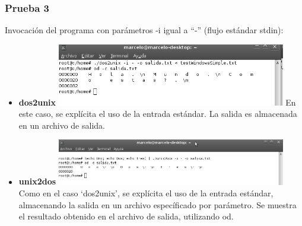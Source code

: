 \documentclass[a4paper,10pt]{article}
\begin{document}
    \subsubsection{Prueba 3}
    Invocaci\'on del programa con par\'ametros -i igual a ``-'' (flujo est\'andar stdin):
      \begin{itemize}
      \item \textbf{dos2unix}
      \newline 
      \includegraphics[width=10cm, viewport=0 0 670 180]{../Informe/Imagenes/prueba3-invocacion-dos2unix.png}
      \newline	
      En este caso, se expl\'icita el uso de la entrada est\'andar. La salida es almacenada en un archivo
      de salida. 
      \item \textbf{unix2dos}
      \newline 
      \includegraphics[width=10cm, viewport=0 0 897 181]{../Informe/Imagenes/prueba3-invocacion-unix2dos.png}	
      \newline
      Como en el caso `dos2unix', se expl\'icita el uso de la entrada est\'andar, almacenando la salida en un archivo espec\'ificado por par\'ametro.
      Se muestra el resultado obtenido en el archivo de salida, utilizando od.
      
    \end{itemize}
\end{document}
